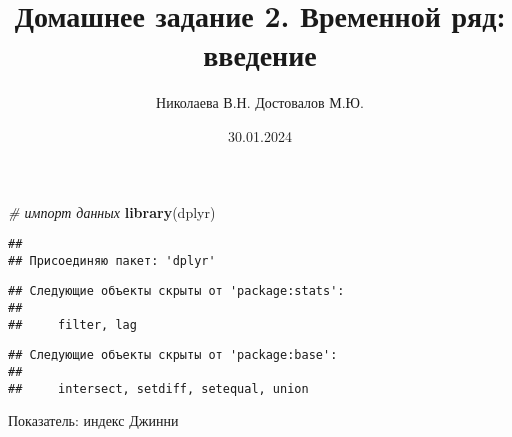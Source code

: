 \documentclass[
]{article}
\title{Домашнее задание 2. Временной ряд: введение}
\author{Николаева В.Н. Достовалов М.Ю.}
\date{30.01.2024}
\newenvironment{Shaded}{\begin{snugshade}}{\end{snugshade}}
\newcommand{\AttributeTok}[1]{\textcolor[rgb]{0.13,0.29,0.53}{#1}}
\newcommand{\CommentTok}[1]{\textcolor[rgb]{0.56,0.35,0.01}{\textit{#1}}}
\newcommand{\DecValTok}[1]{\textcolor[rgb]{0.00,0.00,0.81}{#1}}
\newcommand{\FunctionTok}[1]{\textcolor[rgb]{0.13,0.29,0.53}{\textbf{#1}}}
\newcommand{\NormalTok}[1]{#1}
\newcommand{\OtherTok}[1]{\textcolor[rgb]{0.56,0.35,0.01}{#1}}
\newcommand{\SpecialCharTok}[1]{\textcolor[rgb]{0.81,0.36,0.00}{\textbf{#1}}}
\newcommand{\StringTok}[1]{\textcolor[rgb]{0.31,0.60,0.02}{#1}}
\begin{document}
\maketitle

\begin{Shaded}
\begin{Highlighting}[]
\CommentTok{\# импорт данных}
\FunctionTok{library}\NormalTok{(dplyr)}
\end{Highlighting}
\end{Shaded}

\begin{verbatim}
## 
## Присоединяю пакет: 'dplyr'
\end{verbatim}

\begin{verbatim}
## Следующие объекты скрыты от 'package:stats':
## 
##     filter, lag
\end{verbatim}

\begin{verbatim}
## Следующие объекты скрыты от 'package:base':
## 
##     intersect, setdiff, setequal, union
\end{verbatim}

\begin{Shaded}
\end{Shaded}

Показатель: индекс Джинни
\end{document}
